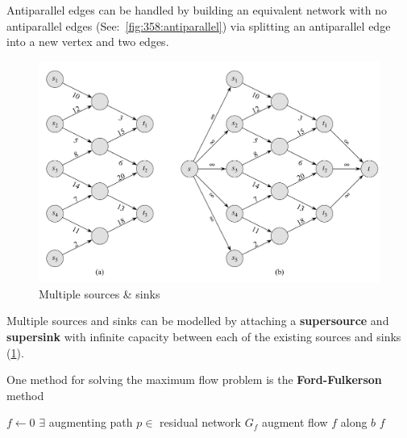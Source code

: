 \documentclass[../notes.tex]{subfiles}
\begin{document}
Antiparallel edges can be handled by building an equivalent network with no antiparallel edges (See:~\ref{fig:358:antiparallel}) via splitting an antiparallel edge into a new vertex and two edges.

\begin{figure}[H]
	\centering
	\includegraphics[width=0.8\linewidth]{img/image_2022-11-21-13-12-11.png}
	\caption{Multiple sources \& sinks}
	\label{fig:358:supersourcesink}
\end{figure}

Multiple sources and sinks can be modelled by attaching a \textbf{supersource} and \textbf{supersink} with infinite capacity between each of the existing sources and sinks (\ref{fig:358:supersourcesink}).



One method for solving the maximum flow problem is the \textbf{Ford-Fulkerson} method



\begin{definition}

	\begin{codebox}
	\li $ f \gets 0 $
	\li \While $ \exists $ augmenting path $p \in$ residual network $G_f$ \Do 
	\li 	augment flow $ f $ along $ b $ \End
	\li \Return $ f $
	\end{codebox}
	
\end{definition}
\end{document}
